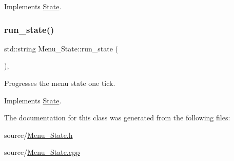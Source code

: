 Implements \hyperlink{classState_a048a3b3ebeaf1c8a553040d42a61c48c}{State}.

\mbox{\label{classMenu__State_a727db35b408300360c261db80399088e}} 
\subsubsection{\texorpdfstring{run\+\_\+state()}{run\_state()}}
{\footnotesize\ttfamily std\+::string Menu\+\_\+\+State\+::run\+\_\+state (\begin{DoxyParamCaption}{ }\end{DoxyParamCaption})\hspace{0.3cm}{\ttfamily [override]}, {\ttfamily [virtual]}}

Progresses the menu state one tick. 

Implements \hyperlink{classState_a84fb17cf9f6a59c78e600b619670a0d9}{State}.



The documentation for this class was generated from the following files\+:\begin{DoxyCompactItemize}
\item 
source/\hyperlink{Menu__State_8h}{Menu\+\_\+\+State.\+h}\item 
source/\hyperlink{Menu__State_8cpp}{Menu\+\_\+\+State.\+cpp}\end{DoxyCompactItemize}
